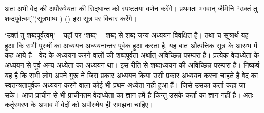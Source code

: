 \begin{myquote}
\end{myquote}

\begin{myquote}
\end{myquote}

\begin{myquote}
\end{myquote}

अतः अभी वेद की अपौरुषेयता की सिद्घान्त को स्पष्टतया वर्णन करेंगे। प्रथमतः भगवान् जैमिनि “उक्तं तु शब्दपूर्वत्वम्”(सूत्रभाष्य ) () इस सूत्र पर विचार करेंगे।

‘उक्तं तु शब्दपूर्वत्वम्' – यहॉ पर ‘शब्द' – शब्द से शब्द जन्य अध्ययन विवक्षित है। तथा च सूत्रार्थ यह हुआ कि सभी पुरुषों का अध्ययन अध्ययनान्तर पूर्वक हुआ करता है, यह बात औत्पत्तिक सूत्र के आरम्भ में कह आये है। वेद के अध्ययन करने वालों की शब्दपूर्वता अर्थात् अविच्छिन्न परम्परा है। प्रत्येक वेदाध्येता के अध्ययन से पूर्व अन्य अध्येता का अध्ययन था। इस रीति से शब्दाध्ययन की अविच्छिन्न परम्परा है। निष्कर्ष यह है कि सभी लोग अपने गुरू ने जिस प्रकार अध्ययन किया उसी प्रकार अध्ययन करना चाहते है वेद का स्वतन्त्रतापूर्वक अध्ययन करने वाला कोई भी प्रथम अध्येता नही हुआ हैं। जिसे उसका कर्ता कहा जा सके। आज प्राचीन से भी प्राचीनतम वेदाध्येता का ज्ञान हमें है किन्तु उसके कर्ता का ज्ञान नहीं है। अतः कर्तृस्मरण के अभाव में वेदों को अपौरुषेय ही समझना चाहिए।


